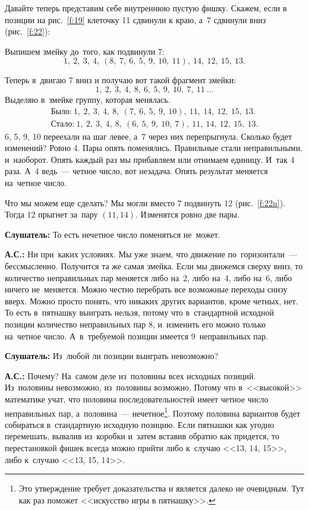 Давайте теперь представим себе внутреннюю пустую фишку. Скажем, если в позиции на рис.~\ref{f:19}
клеточку 11 сдвинули к краю, а~7 сдвинули вниз (рис.~\ref{f:22}):



Выпишем змейку до~того, как подвинули 7:
$$
1, \ 2, \ 3, \ 4, \ (8, \ 7, \ 6, \ 5, \ 9, \ 10, \ 11), \ 14, \ 12, \ 15, \ 13.
$$

Теперь я~двигаю 7 вниз и получаю вот такой фрагмент змейки:
$$
1, \ 2, \ 3, \ 4, \ 8, \ 6, \ 5, \ 9, \ 10, \ 7, \ 11\ \ldots
$$
Выделяю в~змейке группу, которая менялась.
\begin{gather*}
\text{Было:}\ 1, \ 2, \ 3, \ 4, \ 8, \ (7, \ 6, \ 5, \ 9, \ 10), \ 11, \ 14, \ 12, \ 15, \ 13.\\
\text{Стало:}\ 1, \ 2, \ 3, \ 4, \ 8, \ (6, \ 5, \ 9, \ 10, \ 7), \ 11, \ 14, \ 12, \ 15, \ 13.
\end{gather*}
6, 5, 9, 10 переехали на шаг левее, а~7 через них перепрыгнула. Сколько будет изменений? Ровно 4. Пары
опять поменялись. Правильные стали неправильными, и~наоборот. Опять каждый раз мы прибавляем или
отнимаем единицу. И~так 4 раза. А~4 ведь~--- четное число, вот незадача. Опять результат меняется
на~четное число.

Что мы можем еще сделать? Мы могли вместо 7 подвинуть 12 (рис.~\ref{f:22n}). Тогда 12 прыгнет за~пару $(11, 14)$. Изменятся ровно две пары.


\textbf{Слушатель:} То есть нечетное число поменяться не~может.

\textbf{А.С.:} Ни при~каких условиях. Мы уже знаем, что движение по~горизонтали~--- бессмысленно.
Получится та же самая змейка. Если мы движемся сверху вниз, то количество неправильных пар меняется
либо на~2, либо на~4, либо на~6, либо ничего не~меняется. Можно честно перебрать все возможные
переходы снизу вверх. Можно просто понять, что никаких других вариантов, кроме четных, нет. То есть
в~пятнашку выиграть нельзя, потому что в~стандартной исходной позиции количество неправильных пар
8, и~изменить его можно только на~четное число. А~в~требуемой позиции имеется 9~неправильных пар.

\textbf{Слушатель:} Из~любой ли позиции выиграть невозможно?

\textbf{А.С.:} Почему? На~самом деле из~половины всех исходных позиций. Из~половины невозможно, из~половины
возможно. Потому что в~<<высокой>> математике учат, что половина последовательностей имеет четное
число неправильных пар, а~половина~--- нечетное\footnote{Это утверждение требует доказательства
и является далеко не очевидным. Тут как раз поможет <<искусство игры в пятнашку>>.}. Поэтому половина вариантов будет собираться
в~стандартную исходную позицию. Если пятнашки как угодно перемешать, вывалив из~коробки и~затем
вставив обратно как придется, то перестановкой фишек всегда можно прийти либо к~случаю <<13, 14,
15>>, либо к~случаю <<13, 15, 14>>.

